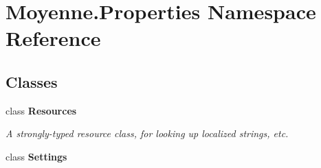 \hypertarget{namespace_moyenne_1_1_properties}{}\section{Moyenne.\+Properties Namespace Reference}
\label{namespace_moyenne_1_1_properties}
\subsection*{Classes}
\begin{DoxyCompactItemize}
\item 
class {\bfseries Resources}
\begin{DoxyCompactList}\small\item\em A strongly-\/typed resource class, for looking up localized strings, etc. \end{DoxyCompactList}\item 
class {\bfseries Settings}
\end{DoxyCompactItemize}
